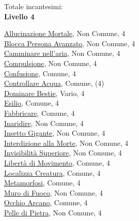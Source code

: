 \begin{multicols}{3}
{{\medskip Totale incantesimi: \theinclvtre\\

\textbf{Livello 4}   

\hyperlink{Allucinazione Mortale}{Allucinazione Mortale}, Non Comune, 4\\
\hyperlink{Blocca Persona Avanzato}{Blocca Persona Avanzato}, Non Comune, 4\\
\hyperlink{Camminare nell'aria}{Camminare nell'aria}, Non Comune, 4\\
\hyperlink{Compulsione}{Compulsione}, Non Comune, 4\\
\hyperlink{Confusione}{Confusione}, Comune, 4\\
\hyperlink{Controllare Acqua}{Controllare Acqua}, Comune, (4)\\
\hyperlink{Dominare Bestie}{Dominare Bestie}, Vario, 4\\
\hyperlink{Esilio}{Esilio}, Comune, 4\\
\hyperlink{Fabbricare}{Fabbricare}, Comune, 4\\
\hyperlink{Inaridire}{Inaridire}, Non Comune, 4\\
\hyperlink{Insetto Gigante}{Insetto Gigante}, Non Comune, 4\\
\hyperlink{Interdizione alla Morte}{Interdizione alla Morte}, Non Comune, 4\\
\hyperlink{Invisibilità Superiore}{Invisibilità Superiore}, Non Comune, 4\\
\hyperlink{Libertà di Movimento}{Libertà di Movimento}, Comune, 4\\
\hyperlink{Localizza Creatura}{Localizza Creatura}, Comune, 4\\
\hyperlink{Metamorfosi}{Metamorfosi}, Comune, 4\\
\hyperlink{Muro di Fuoco}{Muro di Fuoco}, Non Comune, 4\\
\hyperlink{Occhio Arcano}{Occhio Arcano}, Comune, 4\\
\hyperlink{Pelle di Pietra}{Pelle di Pietra}, Non Comune, 4\\
}}
\end{multicols}
